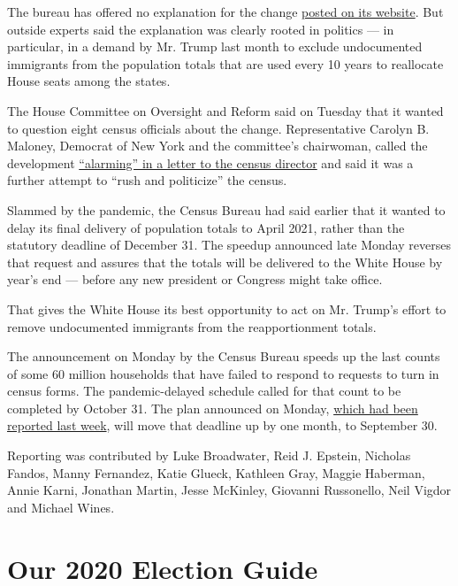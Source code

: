 The bureau has offered no explanation for the change
\href{https://www.census.gov/newsroom/press-releases/2020/delivering-complete-accurate-count.html}{posted
on its website}. But outside experts said the explanation was clearly
rooted in politics --- in particular, in a demand by Mr. Trump last
month to exclude undocumented immigrants from the population totals that
are used every 10 years to reallocate House seats among the states.

The House Committee on Oversight and Reform said on Tuesday that it
wanted to question eight census officials about the change.
Representative Carolyn B. Maloney, Democrat of New York and the
committee's chairwoman, called the development
\href{https://oversight.house.gov/sites/democrats.oversight.house.gov/files/2020-08-04.CBM\%20to\%20Dillingham\%20re\%20Transcribed\%20Interviews.pdf}{``alarming''
in a letter to the census director} and said it was a further attempt to
``rush and politicize'' the census.

Slammed by the pandemic, the Census Bureau had said earlier that it
wanted to delay its final delivery of population totals to April 2021,
rather than the statutory deadline of December 31. The speedup announced
late Monday reverses that request and assures that the totals will be
delivered to the White House by year's end --- before any new president
or Congress might take office.

That gives the White House its best opportunity to act on Mr. Trump's
effort to remove undocumented immigrants from the reapportionment
totals.

The announcement on Monday by the Census Bureau speeds up the last
counts of some 60 million households that have failed to respond to
requests to turn in census forms. The pandemic-delayed schedule called
for that count to be completed by October 31. The plan announced on
Monday,
\href{https://www.nytimes.com/2020/07/28/us/trump-census.html}{which had
been reported last week}, will move that deadline up by one month, to
September 30.

Reporting was contributed by Luke Broadwater, Reid J. Epstein, Nicholas
Fandos, Manny Fernandez, Katie Glueck, Kathleen Gray, Maggie Haberman,
Annie Karni, Jonathan Martin, Jesse McKinley, Giovanni Russonello, Neil
Vigdor and Michael Wines.

\hypertarget{our-2020-election-guide}{%
\section{Our 2020 Election Guide}\label{our-2020-election-guide}}

